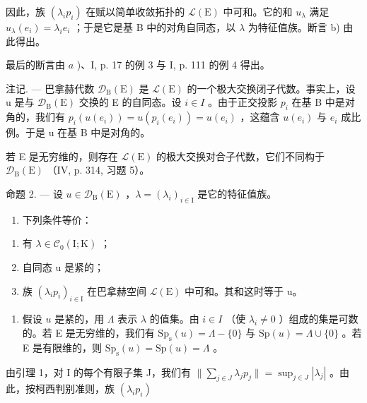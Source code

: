 因此，族 \((\lambda_{i}p_{i})\) 在赋以简单收敛拓扑的 \(\mathcal{L}(\mathrm{E})\) 中可和。它的和 \(u_{\lambda}\) 满足 \(u_{\lambda}(e_{i}) = \lambda_{i}e_{i}\) ；于是它是基 B 中的对角自同态，以 \(\lambda\) 为特征值族。断言 b) 由此得出。

最后的断言由 \(a\) )、I, p. 17 的例 3 与 I, p. 111 的例 4 得出。

注记. --- 巴拿赫代数 \(\mathcal{D}_{\mathrm{B}}(\mathrm{E})\) 是 \(\mathcal{L}(\mathrm{E})\) 的一个极大交换闭子代数。事实上，设 u 是与 \(\mathcal{D}_{\mathrm{B}}(\mathrm{E})\) 交换的 E 的自同态。设 \(i \in I\) 。由于正交投影 \(p_{i}\) 在基 B 中是对角的，我们有 \(p_{i}(u(e_{i})) = u(p_{i}(e_{i})) = u(e_{i})\) ，这蕴含 \(u(e_{i})\) 与 \(e_{i}\) 成比例。于是 u 在基 B 中是对角的。

若 E 是无穷维的，则存在 \(\mathcal{L}(\mathrm{E})\) 的极大交换对合子代数，它们不同构于 \(\mathcal{D}_{\mathrm{B}}(\mathrm{E})\) （IV, p. 314, 习题 5）。

命题 2. --- 设 \(u \in \mathcal{D}_{\mathrm{B}}(\mathrm{E})\) ，\(\lambda = (\lambda_i)_{i \in \mathrm{I}}\) 是它的特征值族。

\begin{enumerate}
\def\labelenumi{\alph{enumi})}
\tightlist
\item
  下列条件等价：
\end{enumerate}

\begin{enumerate}
\def\labelenumi{(\roman{enumi})}
\item
  有 \(\lambda \in \mathcal{C}_{0}(\mathrm{I};\mathrm{K})\) ；
\item
  自同态 u 是紧的；
\item
  族 \((\lambda_{i}p_{i})_{i\in\mathrm{I}}\) 在巴拿赫空间 \(\mathcal{L}(\mathrm{E})\) 中可和。其和这时等于 u。
\end{enumerate}

\begin{enumerate}
\def\labelenumi{\alph{enumi})}
\setcounter{enumi}{1}
\tightlist
\item
  假设 \(u\) 是紧的，用 \(\Lambda\) 表示 \(\lambda\) 的值集。由 \(i \in I\) （使 \(\lambda_i \neq 0\) ）组成的集是可数的。若 E 是无穷维的，我们有 \(\mathrm{Sp}_{\mathrm{s}}(u) = \Lambda - \{0\}\) 与 \(\mathrm{Sp}(u) = \Lambda \cup \{0\}\) 。若 E 是有限维的，则 \(\mathrm{Sp}_{\mathrm{s}}(u) = \mathrm{Sp}(u) = \Lambda\) 。
\end{enumerate}

由引理 1，对 I 的每个有限子集 J，我们有 \(\| \sum_{j\in J}\lambda_jp_j\| = \sup_{j\in J}|\lambda_j|\) 。由此，按柯西判别准则，族 \((\lambda_ip_i)\)

